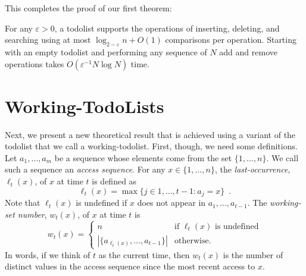\documentclass[12pt]{patmorin}
\newcommand{\eps}{\varepsilon}
\begin{document}
This completes the proof of our first theorem:

\begin{thm}
For any $\eps >0$, a todolist supports the operations of inserting,
deleting, and searching using at most $\log_{2-\eps} n + O(1)$ comparisons
per operation.  Starting with an empty todolist and performing any
sequence of $N$ add and remove operations takes $O(\eps^{-1}N\log
N)$ time.
\end{thm}

%
%

\section{Working-TodoLists}

Next, we present a new theoretical result that is achieved using a
variant of the todolist that we call a working-todolist.  First, though, we need
some definitions.  Let $a_1,\ldots,a_m$ be a sequence whose elements come
from the set $\{1,\ldots,n\}$.  We call such a sequence an \emph{access
sequence}. For any $x\in\{1,\ldots,n\}$, the \emph{last-occurrence},
$\ell_t(x)$, of $x$ at time $t$ is defined as
\[
   \ell_t(x)=\max\{j\in{1,\ldots,t-1}: a_{j} = x\} \enspace .
\]
Note that $\ell_t(x)$ is undefined if $x$ does not appear in
$a_1,\ldots,a_{t-1}$.  The \emph{working-set number}, $w_t(x)$, of $x$
at time $t$ is
\[
    w_t(x) = \begin{cases}
               n & \text{if $\ell_t(x)$ is undefined} \\
               |\{a_{\ell_t(x)},\ldots,a_{t-1}\}| & \text{otherwise.}
             \end{cases}
\]
In words, if we think of $t$ as the current time, then $w_t(x)$ is the
number of distinct values in the access sequence since the most recent
access to $x$.
\end{document}
